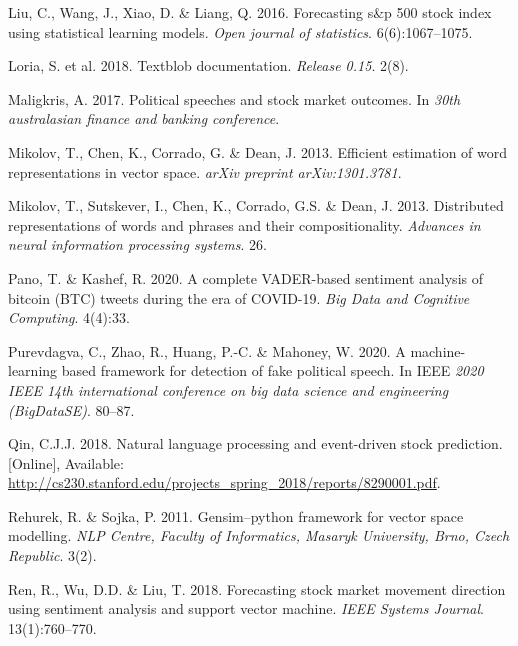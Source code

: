 \documentclass[11pt,preprint, authoryear]{elsarticle}
\numberwithin{equation}{section}
\numberwithin{figure}{section}
\numberwithin{table}{section}
\newlength{\cslhangindent}
\newenvironment{CSLReferences}%
  {\setlength{\parindent}{0pt}%
  \everypar{\setlength{\hangindent}{\cslhangindent}}\ignorespaces}%
  {\par}
\begin{document}
\begin{CSLReferences}{1}{0}
\leavevmode{}%
Liu, C., Wang, J., Xiao, D. \& Liang, Q. 2016. Forecasting s\&p 500
stock index using statistical learning models. \emph{Open journal of
statistics}. 6(6):1067--1075.

\leavevmode{}%
Loria, S. et al. 2018. Textblob documentation. \emph{Release 0.15}.
2(8).

\leavevmode{}%
Maligkris, A. 2017. Political speeches and stock market outcomes. In
\emph{30th australasian finance and banking conference}.

\leavevmode{}%
Mikolov, T., Chen, K., Corrado, G. \& Dean, J. 2013. Efficient
estimation of word representations in vector space. \emph{arXiv preprint
arXiv:1301.3781}.

\leavevmode{}%
Mikolov, T., Sutskever, I., Chen, K., Corrado, G.S. \& Dean, J. 2013.
Distributed representations of words and phrases and their
compositionality. \emph{Advances in neural information processing
systems}. 26.

\leavevmode{}%
Pano, T. \& Kashef, R. 2020. A complete VADER-based sentiment analysis
of bitcoin (BTC) tweets during the era of COVID-19. \emph{Big Data and
Cognitive Computing}. 4(4):33.

\leavevmode{}%
Purevdagva, C., Zhao, R., Huang, P.-C. \& Mahoney, W. 2020. A
machine-learning based framework for detection of fake political speech.
In IEEE \emph{2020 IEEE 14th international conference on big data
science and engineering (BigDataSE)}. 80--87.

\leavevmode{}%
Qin, C.J.J. 2018. Natural language processing and event-driven stock
prediction. {[}Online{]}, Available:
\url{http://cs230.stanford.edu/projects_spring_2018/reports/8290001.pdf}.

\leavevmode{}%
Rehurek, R. \& Sojka, P. 2011. Gensim--python framework for vector space
modelling. \emph{NLP Centre, Faculty of Informatics, Masaryk University,
Brno, Czech Republic}. 3(2).

\leavevmode{}%
Ren, R., Wu, D.D. \& Liu, T. 2018. Forecasting stock market movement
direction using sentiment analysis and support vector machine.
\emph{IEEE Systems Journal}. 13(1):760--770.


\end{CSLReferences}
\end{document}
